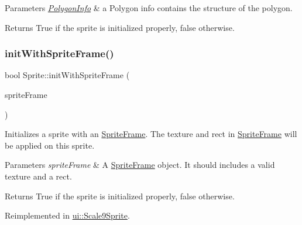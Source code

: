 \begin{DoxyParams}{Parameters}
{\em \hyperlink{classPolygonInfo}{Polygon\+Info}} & a Polygon info contains the structure of the polygon. \\
\hline
\end{DoxyParams}
\begin{DoxyReturn}{Returns}
True if the sprite is initialized properly, false otherwise. 
\end{DoxyReturn}
\mbox{\label{classSprite_a18c315cb483cfec2ed836c02c958810b}} 
\subsubsection{\texorpdfstring{init\+With\+Sprite\+Frame()}{initWithSpriteFrame()}\hspace{0.1cm}{\footnotesize\ttfamily [1/2]}}
{\footnotesize\ttfamily bool Sprite\+::init\+With\+Sprite\+Frame (\begin{DoxyParamCaption}\item[{\hyperlink{classSpriteFrame}{Sprite\+Frame} $\ast$}]{sprite\+Frame }\end{DoxyParamCaption})\hspace{0.3cm}{\ttfamily [virtual]}}

Initializes a sprite with an \hyperlink{classSpriteFrame}{Sprite\+Frame}. The texture and rect in \hyperlink{classSpriteFrame}{Sprite\+Frame} will be applied on this sprite.


\begin{DoxyParams}{Parameters}
{\em sprite\+Frame} & A \hyperlink{classSpriteFrame}{Sprite\+Frame} object. It should includes a valid texture and a rect. \\
\hline
\end{DoxyParams}
\begin{DoxyReturn}{Returns}
True if the sprite is initialized properly, false otherwise. 
\end{DoxyReturn}


Reimplemented in \hyperlink{classui_1_1Scale9Sprite_a77f0c229307f987be75ebad959cb2b18}{ui\+::\+Scale9\+Sprite}.

\mbox{\label{classSprite_ab677ce26c6a82876396b0a8ac5c16704}} 
